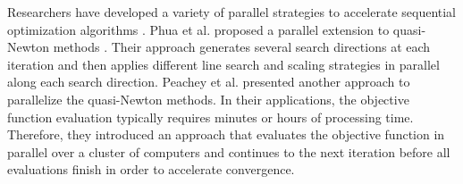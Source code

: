 \documentclass{egpubl}
\begin{document}
Researchers have developed a variety of parallel strategies to accelerate sequential optimization algorithms \cite{spedicato_algorithms_2012}.
Phua et al. \cite{phua_parallel_1998} proposed a parallel extension to quasi-Newton methods \cite{yang_optimization_2001}. Their approach generates several search directions at each iteration and then applies different line search and scaling strategies in parallel along each search direction.
Peachey et al. \cite{peachey_parallel_2009} presented another approach to parallelize the quasi-Newton methods.
In their applications, the objective function evaluation typically requires minutes or hours of processing time. Therefore, they introduced an approach that evaluates the objective function in parallel over a cluster of computers and continues to the next iteration before all evaluations finish in order to accelerate convergence.

\end{document}
